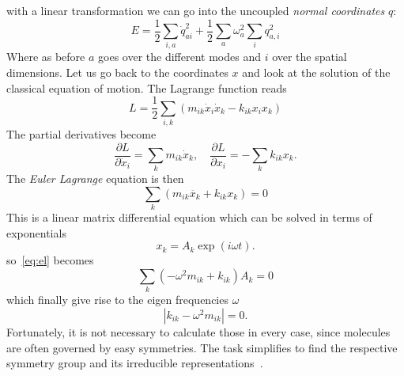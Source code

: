 with a linear transformation we can go into the uncoupled \textit{normal coordinates} $q$:
\begin{equation}
    E = \frac{1}{2} \sum_{i,a} \dot{q}^2_{ai} + \frac{1}{2} \sum_a \omega_a^2 \sum_i q^2_{a,i} 
\end{equation}
Where as before $a$ goes over the different modes and $i$ over the spatial dimensions.
Let us go back to the coordinates $x$ and look at the solution of the classical equation
of motion. The Lagrange function reads
\begin{equation}
    L = \frac{1}{2} \sum_{i,k} (m_{ik} \dot{x}_i\dot{x}_k -  k_{ik} x_i x_k   )
\end{equation}
The partial derivatives become 
\begin{equation}
    \frac{\partial L}{\partial \dot{x}_i} = \sum_k m_{ik} \dot{x}_k , \quad 
    \frac{\partial L}{\partial x_i} = - \sum_k k_{ik} x_k.
\end{equation}
The \textit{Euler Lagrange} equation is then 
\begin{equation}
    \label{eq:el}
    \sum_k (m_{ik} \ddot{x_k} + k_{ik} x_k) = 0 
\end{equation}
This is a linear matrix differential equation which can be solved in terms of exponentials
\begin{equation}
    x_k = A_k \exp(i\omega t).
\end{equation}
so~\eqref{eq:el} becomes 
\begin{equation}
    \sum_k \left( -\omega^2 m_{ik} + k_{ik} \right)A_k = 0
\end{equation}
which finally give rise to the eigen frequencies $\omega$
\begin{equation}
    |k_{ik} - \omega^2 m_{ik}| = 0. 
\end{equation}
Fortunately, it is not necessary to calculate those in every case, since
molecules are often governed by easy symmetries. The task simplifies to
find the respective symmetry group and its irreducible representations~\cite{landau1977quantum}. 


